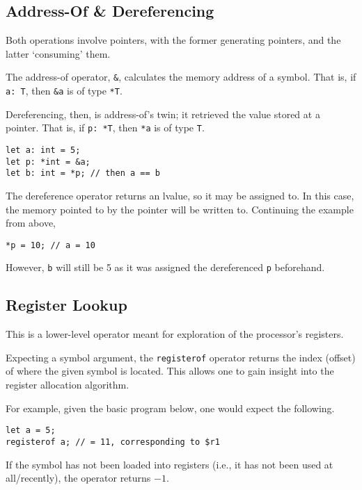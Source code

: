 \subsection{Address-Of \& Dereferencing}\label{subsec:address-of-&-dereferencing}

Both operations involve pointers, with the former generating pointers, and the latter `consuming' them.

The address-of operator, \texttt{\&}, calculates the memory address of a symbol.
That is, if \texttt{a: T}, then \texttt{\&a} is of type \texttt{*T}.

Dereferencing, then, is address-of's twin; it retrieved the value stored at a pointer.
That is, if \texttt{p: *T}, then \texttt{*a} is of type \texttt{T}.

\begin{lstlisting}[language=CustomLang]
let a: int = 5;
let p: *int = &a;
let b: int = *p; // then a == b
\end{lstlisting}

The dereference operator returns an lvalue, so it may be assigned to.
In this case, the memory pointed to by the pointer will be written to.
Continuing the example from above,

\begin{lstlisting}[language=CustomLang]
*p = 10; // a = 10
\end{lstlisting}

However, \texttt{b} will still be 5 as it was assigned the dereferenced \texttt{p} beforehand.

\subsection{Register Lookup}

This is a lower-level operator meant for exploration of the processor's registers.

Expecting a symbol argument, the \texttt{registerof} operator returns the index (offset) of where the given symbol is located.
This allows one to gain insight into the register allocation algorithm.

For example, given the basic program below, one would expect the following.

\begin{lstlisting}[language=CustomLang]
let a = 5;
registerof a; // = 11, corresponding to $r1
\end{lstlisting}

If the symbol has not been loaded into registers (i.e., it has not been used at all/recently), the operator returns \(-1\).

